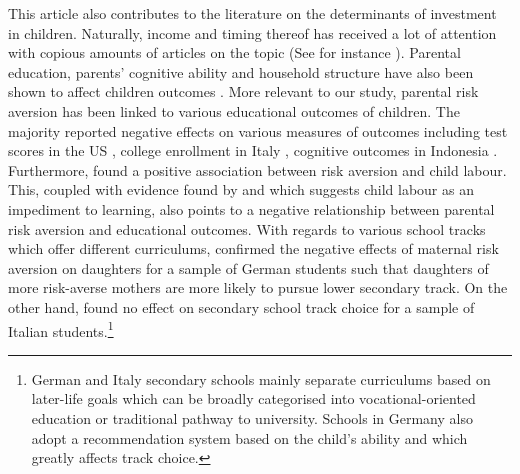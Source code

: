 \documentclass[emulatestandardclasses, 10pt, abstract = true]{scrartcl}
\begin{document}
This article also contributes to the literature on the determinants of investment in children. Naturally, income and timing thereof has received a lot of attention with copious amounts of articles on the topic (See for instance \citet{brooks1997effects, yeung2002money, carneiro2003human,dahl2012impact, carneiro2016partial, attanasio2020human}). Parental education, parents' cognitive ability and household structure have also been shown to affect children outcomes \citep{chevalier2004parental, brown2004family, guryan2008parental, schady2011parents}. More relevant to our study, parental risk aversion has been linked to various educational outcomes of children. The majority reported negative effects on various measures of outcomes including test scores in the US \citep{brown2012parental}, college enrollment in Italy \citep{checchi2014parents}, cognitive outcomes in Indonesia \citep{hartarto2023parental}. Furthermore, \citet{frempong2021risk} found a positive association between risk aversion and child labour. This, coupled with evidence found by \citet{HEADY2003385} and \citet{bezerra2009impact} which suggests child labour as an impediment to learning, also points to a negative relationship between parental risk aversion and educational outcomes. With regards to various school tracks which offer different curriculums, \citet{wolfel2012parental} confirmed the negative effects of maternal risk aversion on daughters for a sample of German students such that daughters of more risk-averse mothers are more likely to pursue lower secondary track. On the other hand, \citet{leonardi2007parents} found no effect on secondary school track choice for a sample of Italian students.\footnote{German and Italy secondary schools mainly separate curriculums based on later-life goals which can be broadly categorised into vocational-oriented education or traditional pathway to university. Schools in Germany also adopt a recommendation system based on the child's ability and which greatly affects track choice.}   
\end{document}
